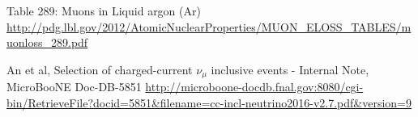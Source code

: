 \documentclass[a4paper,11pt]{article}
\begin{document}
\begin{thebibliography}{99}
   Table 289: Muons in Liquid argon (Ar) \url{http://pdg.lbl.gov/2012/AtomicNuclearProperties/MUON_ELOSS_TABLES/muonloss_289.pdf}

  An et al,
  Selection of charged-current $\nu_\mu$ inclusive events - Internal Note,
  MicroBooNE Doc-DB-5851
  \url{http://microboone-docdb.fnal.gov:8080/cgi-bin/RetrieveFile?docid=5851&filename=cc-incl-neutrino2016-v2.7.pdf&version=9}








\end{thebibliography}
\end{document}
